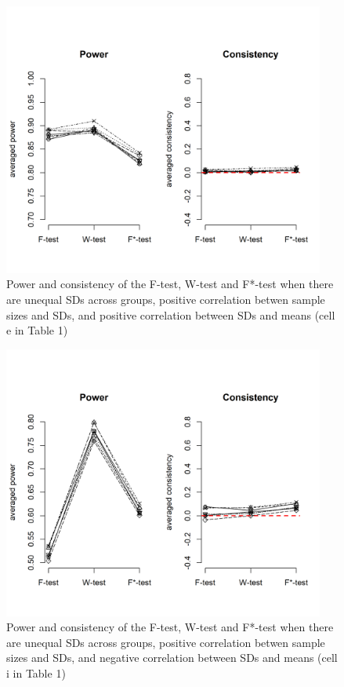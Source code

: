 \documentclass[man,floatsintext]{apa6}
\begin{document}
\begin{figure}
\includegraphics[width=400px]{Rmarkdown folder/Rmarkdown inputs/Fig2h} \caption{Power and consistency of the F-test, W-test and F*-test when there are unequal SDs across groups, positive correlation betwen sample sizes and SDs, and positive correlation between SDs and means (cell e  in Table 1)}\label{fig:unnamed-chunk-14}
\end{figure}

\begin{figure}
\includegraphics[width=400px]{Rmarkdown folder/Rmarkdown inputs/Fig2i} \caption{Power and consistency of the F-test, W-test and F*-test when there are unequal SDs across groups, positive correlation betwen sample sizes and SDs, and negative correlation between SDs and means (cell i  in Table 1)}\label{fig:unnamed-chunk-15}
\end{figure}
\end{document}
